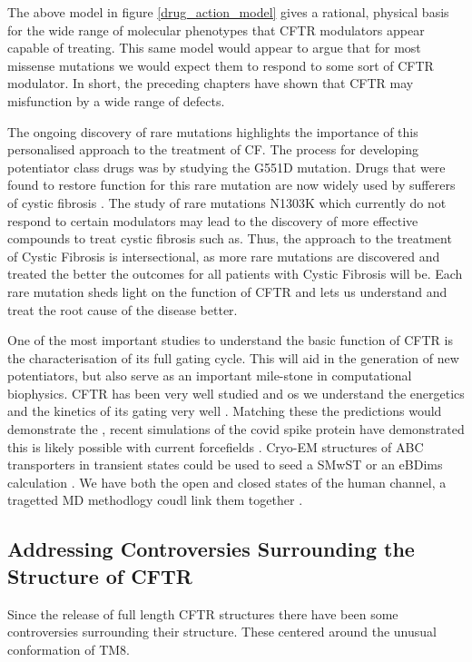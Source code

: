 The above model in figure \ref{drug_action_model} gives a rational, physical basis for the wide range of molecular phenotypes that CFTR modulators appear capable of treating. This same model would appear to argue that for most missense mutations we would expect them to respond to some sort of CFTR modulator. In short, the preceding chapters have shown that CFTR may misfunction by a wide range of defects. 

The ongoing discovery of rare mutations highlights the importance of this personalised approach to the treatment of CF. The process for developing potentiator class drugs was by studying the G551D mutation. Drugs that were found to restore function for this rare mutation are now widely used by sufferers of cystic fibrosis \cite{vangoor2009}. The study of rare mutations N1303K which currently do not respond to certain modulators may lead to the discovery of more effective compounds to treat cystic fibrosis such as. Thus, the approach to the treatment of Cystic Fibrosis is intersectional, as more rare mutations are discovered and treated the better the outcomes for all patients with Cystic Fibrosis will be. Each rare mutation sheds light on the function of CFTR and lets us understand and treat the root cause of the disease better.

One of the most important studies to understand the basic function of CFTR is the characterisation of its full gating cycle. This will aid in the generation of new potentiators, but also serve as an important mile-stone in computational biophysics. CFTR has been very well studied and os we understand the energetics and the kinetics of its gating very well \cite{csanady2017}. Matching these the predictions would demonstrate the , recent simulations of the covid spike protein have demonstrated this is likely possible with current forcefields \cite{casalino2021}. Cryo-EM structures of ABC transporters in transient states could be used to seed a SMwST or an eBDims calculation \cite{hofmann2019, orellana2016, roux2021, pan2008}. We have both the open and closed states of the human channel, a tragetted MD methodlogy coudl link them together \cite{zhang2018, liu2017, moradi2015}.

\subsection{Addressing Controversies Surrounding the Structure of CFTR}

Since the release of full length CFTR structures there have been some controversies surrounding their structure. These centered around the unusual conformation of TM8.

